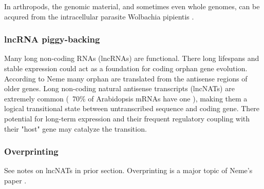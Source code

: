     In arthropods, the genomic material, and sometimes even whole genomes, can
    be acqured from the intracellular parasite Wolbachia pipientis
    \cite{hotopp_widespread_2007}.

\subsubsection{lncRNA piggy-backing}

    Many long non-coding RNAs (lncRNAs) are functional. There long lifespans
    and stable expression could act as a foundation for coding orphan gene
    evolution. According to Neme \cite{neme_phylogenetic_2013} many orphan are
    translated from the antisense regions of older genes. Long non-coding
    natural antisense transcripts (lncNATs) are extremely common (~70\% of
    Arabidopsis mRNAs have one \cite{wang_genome-wide_2014}), making them a
    logical transitional state between untranscribed sequence and coding gene.
    There potential for long-term expression and their frequent regulatory
    coupling with their "host" gene may catalyze the transition.

\subsubsection{Overprinting}

    See notes on lncNATs in prior section. Overprinting is a major topic of
    Neme's paper \cite{neme_phylogenetic_2013}.

